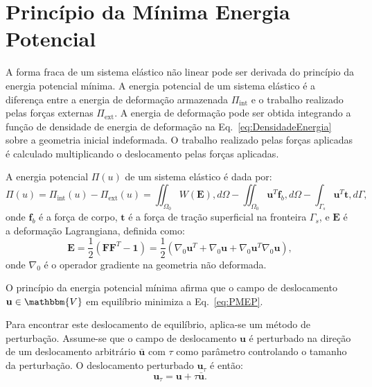 \chapter{Princípio da Mínima Energia Potencial }\label{ch:PMEP}

A forma fraca de um sistema elástico não linear pode ser derivada do princípio da energia potencial mínima. A energia potencial de um sistema elástico é a diferença entre a energia de deformação armazenada $\Pi_{\text{int}}$ e o trabalho realizado pelas forças externas $\Pi_{\text{ext}}$. A energia de deformação pode ser obtida integrando a função de densidade de energia de deformação na Eq.~\eqref{eq:DensidadeEnergia} sobre a geometria inicial indeformada. O trabalho realizado pelas forças aplicadas é calculado multiplicando o deslocamento pelas forças aplicadas. %

A energia potencial $\Pi(u)$ de um sistema elástico é dada por:
\begin{equation}\label{eq:PMEP}
	\Pi(u) = \Pi_{\text{int}}(u) - \Pi_{\text{ext}}(u) = \iint_{\Omega_0} W(\mathbf{E}) , d\Omega - \iint_{\Omega_0} \mathbf{u}^T \mathbf{f}_b , d\Omega - \int_{\Gamma_s} \mathbf{u}^T \mathbf{t} , d\Gamma,
\end{equation}
onde $\mathbf{f}_b$ é a força de corpo, $\mathbf{t}$ é a força de tração superficial na fronteira $\Gamma_s$, e $\mathbf{E}$ é a deformação Lagrangiana, definida como:
\begin{equation}
	\mathbf{E} = \frac{1}{2}\left(\mathbf{F}\mathbf{F}^T-\mathbf{1}\right)=\frac{1}{2} \left( \nabla_0 \mathbf{u}^T + \nabla_0 \mathbf{u} + \nabla_0 \mathbf{u}^T \nabla_0 \mathbf{u} \right),
\end{equation}
onde $\nabla_0$ é o operador gradiente na geometria não deformada.

O princípio da energia potencial mínima afirma que o campo de deslocamento $\mathbf{u} \in \mathbbm{V}$ em equilíbrio minimiza a Eq.~\eqref{eq:PMEP}. 

Para encontrar este deslocamento de equilíbrio, aplica-se um método de perturbação. Assume-se que o campo de deslocamento $\mathbf{u}$ é perturbado na direção de um deslocamento arbitrário $\mathbf{\bar{u}}$ com $\tau$ como parâmetro controlando o tamanho da perturbação. O deslocamento perturbado $\mathbf{u}_\tau$ é então:
\begin{equation}
	\mathbf{u}_\tau = \mathbf{u} + \tau \mathbf{\bar{u}}.
\end{equation}

